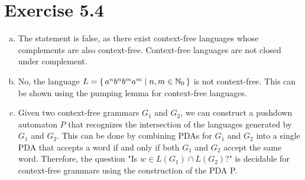 \documentclass{article} %
\newcommand{\homeworkNumber}{5}
\begin{document}
\section*{Exercise \homeworkNumber.4}
\begin{enumerate}[(a)]
\item
The statement is false, as there exist context-free languages whose complements are also context-free. Context-free languages are not closed under complement.
\item
No, the language $L = \set{a^n b^n b^m a^m \mid n, m \in \mathbb{N}_0}$ is not context-free. This can be shown using the pumping lemma for context-free languages.
\item
Given two context-free grammars $G_1$ and $G_2$, we can construct a pushdown automaton $P$ that recognizes the intersection of the languages generated by $G_1$ and $G_2$. This can be done by combining PDAs for $G_1$ and $G_2$ into a single PDA that accepts a word if and only if both $G_1$ and $G_2$ accept the same word. Therefore, the question "Is $w \in L(G_1) \cap L(G_2)$?" is decidable for context-free grammars using the construction of the PDA P.
\end{enumerate}
\end{document}
